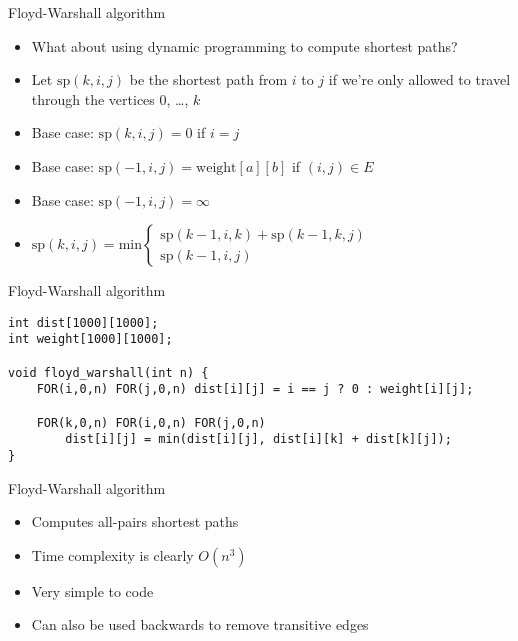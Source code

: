 \documentclass[12pt,t]{beamer}
\newcommand{\bi}{\begin{itemize}}
\newcommand{\ei}{\end{itemize}}
\begin{document}
\begin{frame}{Floyd-Warshall algorithm}
    \vspace{20pt}
    \bi
        \item What about using dynamic programming to compute shortest paths?
        \vspace{10pt}
    \item Let $\mathrm{sp}(k, i, j)$ be the shortest path from $i$ to $j$ if we're only allowed to travel through the vertices $0$, \ldots, $k$
        \vspace{5pt}
    \item Base case: $\mathrm{sp}(k, i, j) = 0$ if $i = j$
    \item Base case: $\mathrm{sp}(-1, i, j) = \mathrm{weight}[a][b]$ if $(i,j) \in E$
    \item Base case: $\mathrm{sp}(-1, i, j) = \infty$
        \vspace{5pt}
    \item $\mathrm{sp}(k, i, j) = \mathrm{min} \left\{
	\begin{array}{l}
        \mathrm{sp}(k - 1, i, k) + \mathrm{sp}(k - 1, k, j) \\
        \mathrm{sp}(k - 1, i, j)
	\end{array}
\right.$
    \ei
\end{frame}

\begin{frame}[fragile]{Floyd-Warshall algorithm}
    \begin{verbatim}
int dist[1000][1000];
int weight[1000][1000];

void floyd_warshall(int n) {
    FOR(i,0,n) FOR(j,0,n) dist[i][j] = i == j ? 0 : weight[i][j];

    FOR(k,0,n) FOR(i,0,n) FOR(j,0,n)
        dist[i][j] = min(dist[i][j], dist[i][k] + dist[k][j]);
}
    \end{verbatim}
\end{frame}

\begin{frame}{Floyd-Warshall algorithm}
    \vspace{40pt}
    \bi
\item Computes all-pairs shortest paths
\item Time complexity is clearly $O(n^3)$
\item Very simple to code
    \vspace{10pt}
\item Can also be used backwards to remove transitive edges
    \ei
\end{frame}
\end{document}
